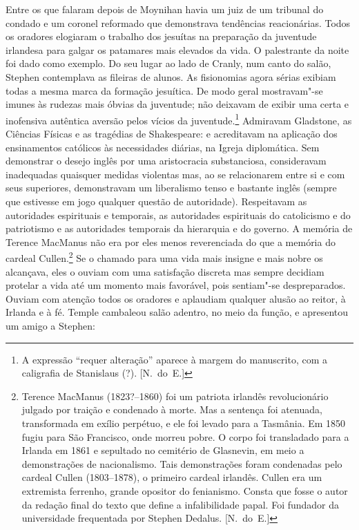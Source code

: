 Entre os que falaram depois de Moynihan havia um juiz de um tribunal do condado
e um coronel reformado que demonstrava tendências reacionárias.  Todos os
oradores elogiaram o trabalho dos jesuítas na preparação da juventude irlandesa
para galgar os patamares mais elevados da vida.  O palestrante da noite foi
dado como exemplo.  Do seu lugar ao lado de Cranly, num canto do salão, Stephen
contemplava as fileiras de alunos.  As fisionomias agora sérias exibiam todas a
mesma marca da formação jesuítica.  De modo geral mostravam"-se imunes às rudezas
mais óbvias da juventude; não deixavam de exibir uma certa e inofensiva
\label{autentica"-aversao} autêntica aversão pelos vícios da juventude.\footnote[\setcounter{symbol}{2}]{ A expressão “requer
alteração” aparece à margem do manuscrito, com a caligrafia de Stanislaus (?). [N.~do~E.]}
Admiravam Gladstone, as Ciências Físicas e as tragédias de Shakespeare: e
acreditavam na aplicação dos ensinamentos católicos às necessidades diárias, na
Igreja diplomática.  Sem demonstrar o desejo inglês por uma aristocracia
substanciosa, consideravam inadequadas quaisquer medidas \mbox{violentas} mas, ao se
relacionarem entre si e com seus superiores, demonstravam um liberalismo tenso
e bastante inglês (sempre que estivesse em jogo qualquer questão de
autoridade).  Respeitavam as autoridades espirituais e temporais, as
autoridades espirituais do catolicismo e do patriotismo e as autoridades
temporais da hierarquia e do governo.  A memória de Terence MacManus não era
por eles menos reverenciada do que a memória do cardeal Cullen.\footnote[\setcounter{symbol}{3}]{
Terence MacManus (1823?--1860) foi um patriota irlandês revolucionário julgado
por traição e condenado à morte.  Mas a sentença foi atenuada, transformada em
exílio perpétuo, e ele foi levado para a Tasmânia.  Em 1850 fugiu para São
Francisco, onde morreu pobre.  O corpo foi transladado para a Irlanda em 1861 e
sepultado no cemitério de Glasnevin, em meio a demonstrações de nacionalismo.
Tais demonstrações foram condenadas pelo cardeal Cullen (1803--1878), o
primeiro cardeal irlandês.  Cullen era um extremista ferrenho, grande opositor
do fenianismo.  Consta que fosse o autor da redação final do texto que define a
infalibilidade papal.  Foi fundador da universidade frequentada por Stephen
Dedalus. [N.~do~E.]}  Se o chamado para uma vida mais insigne e mais nobre os
alcançava, eles o ouviam com uma satisfação discreta mas sempre decidiam
protelar a vida até um momento mais favorável, pois sentiam"-se despreparados.
Ouviam com atenção todos os oradores e aplaudiam qualquer alusão ao reitor, à
Irlanda e à fé.  Temple cambaleou salão adentro, no meio da função, e
apresentou um amigo a Stephen:


